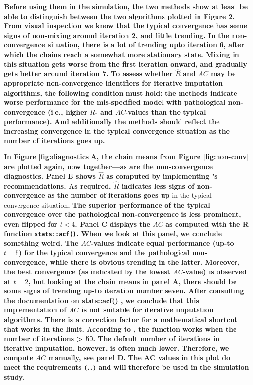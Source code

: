 \documentclass[Royal,times,sageh]{sagej}
\begin{document}
\textbf{Before using them in the simulation, the two methods show at
least be able to distinguish between the two algorithms plotted in
Figure 2. From visual inspection we know that the typical convergence
has some signs of non-mixing around iteration 2, and little trending. In
the non-convergence situation, there is a lot of trending upto iteration
6, after which the chains reach a somewhat more stationary state. Mixing
in this situation gets worse from the first iteration onward, and
gradually gets better around iteration 7. To assess whether
\(\widehat{R}\) and \(AC\) may be appropriate non-convergence
identifiers for iterative imputation algorithms, the following condition
must hold: the methods indicate worse performance for the mis-specified
model with pathological non-convergence (i.e., higher \(\widehat{R}\)-
and \(AC\)-values than the typical performance). And additionally the
methods should reflect the increasing convergence in the typical
convergence situation as the number of iterations goes up.}

\textbf{In Figure \ref{fig:diagnostics}A, the chain means from Figure
\ref{fig:non-conv} are plotted again, now together---as are the
non-convergence diagnostics. Panel B shows \(\widehat{R}\) as computed
by implementing \citet{veht19} 's recommendations. As required,
\(\widehat{R}\) indicates less signs of non-convergence as the number of
iterations goes up }in the typical convergence situation\textbf{. The
superior performance of the typical convergence over the pathological
non-convergence is less prominent, even flipped for \(t<4\). Panel C
displays the \(AC\) as computed with the R function
\texttt{stats::acf()}. When we look at this panel, we conclude something
weird. The \(AC\)-values indicate equal performance (up-to \(t=5\)) for
the typical convergence and the pathological non-convergence, while
there is obvious trending in the latter. Moreover, the best convergence
(as indicated by the lowest \(AC\)-value) is observed at \(t=2\), but
looking at the chain means in panel A, there should be some signs of
trending up-to iteration number seven. After consulting the
documentation on stats::acf() \citep{R}, we conclude that this
implementation of \(AC\) is not suitable for iterative imputation
algorithms. There is a correction factor for a mathematical shortcut
that works in the limit. According to \citet{box15}, the function works
when the number of iterations \textgreater{} 50. The default number of
iterations in iterative imputation, however, is often much lower.
Therefore, we compute \(AC\) manually, see panel D. The AC values in
this plot do meet the requirements (\ldots) and will therefore be used
in the simulation study.}
\end{document}
